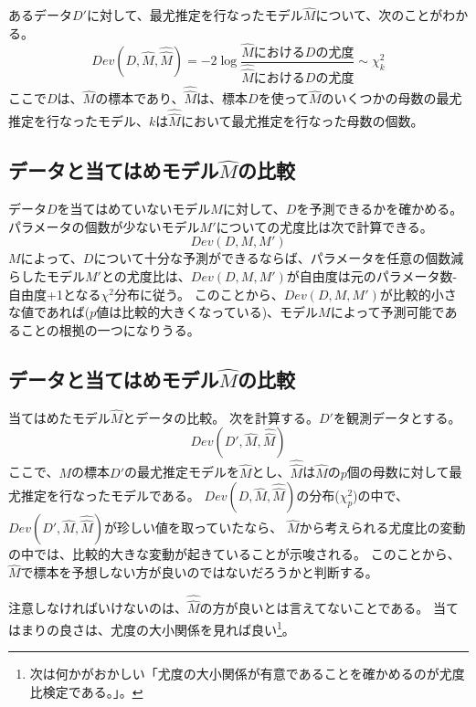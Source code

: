 あるデータ$D'$に対して、最尤推定を行なったモデル$\hat{M}$について、次のことがわかる。
\begin{equation*}
    Dev(D,\hat{M},\hat{\hat{M}}) = -2\log\frac{\hat{M}におけるDの尤度}{\hat{\hat{M}}におけるDの尤度} \sim \chi^2_{k}
\end{equation*}
ここで$D$は、$\hat{M}$の標本であり、$\hat{\hat{M}}$は、標本$D$を使って$\hat{M}$のいくつかの母数の最尤推定を行なったモデル、$k$は$\hat{\hat{M}}$において最尤推定を行なった母数の個数。

\subsection{データと当てはめモデル$\hat{M}$の比較}
データ$D$を当てはめていないモデル$M$に対して、$D$を予測できるかを確かめる。
パラメータの個数が少ないモデル$M'$についての尤度比は次で計算できる。
\begin{equation*}
    Dev(D,M,M')
\end{equation*}
$M$によって、$D$について十分な予測ができるならば、パラメータを任意の個数減らしたモデル$M'$との尤度比は、$Dev(D,M,M')$が自由度は元のパラメータ数-自由度+1となる$\chi^2$分布に従う。
このことから、$Dev(D,M,M')$が比較的小さな値であれば($p$値は比較的大きくなっている)、モデル$M$によって予測可能であることの根拠の一つになりうる。


\subsection{データと当てはめモデル$\hat{M}$の比較}
当てはめたモデル$\hat{M}$とデータの比較。
次を計算する。$D'$を観測データとする。
\begin{equation*}
    Dev(D',\hat{M},\hat{\hat{M}}) 
\end{equation*}
ここで、$M$の標本$D'$の最尤推定モデルを$\hat{M}$とし、$\hat{\hat{M}}$は$\hat{M}$の$p$個の母数に対して最尤推定を行なったモデルである。
$Dev(D,\hat{M},\hat{\hat{M}}) $の分布($\chi^2_p$)の中で、$Dev(D',\hat{M},\hat{\hat{M}}) $が珍しい値を取っていたなら、
$\hat{M}$から考えられる尤度比の変動の中では、比較的大きな変動が起きていることが示唆される。
このことから、$\hat{M}$で標本を予想しない方が良いのではないだろうかと判断する。

注意しなければいけないのは、$\hat{\hat{M}}$の方が良いとは言えてないことである。
当てはまりの良さは、尤度の大小関係を見れば良い\footnote{次は何かがおかしい「尤度の大小関係が有意であることを確かめるのが尤度比検定である。」。}。%

